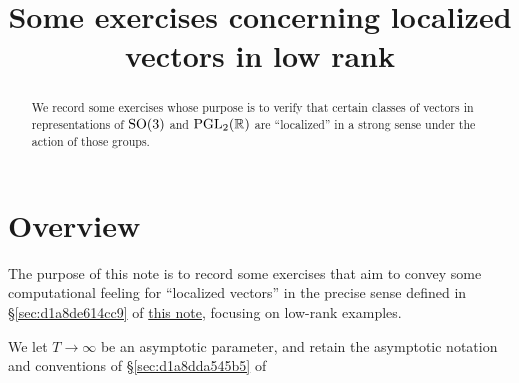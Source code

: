 \documentclass[reqno]{amsart} 
\title{Some exercises concerning localized vectors in low rank}
\numberwithin{equation}{section}
\numberwithin{theorem}{section}
\begin{document}
\maketitle
\tableofcontents


\begin{abstract}
We record some exercises whose purpose is to verify that certain classes of vectors in representations of $\operatorname{SO}(3)$ and $\operatorname{PGL}_2(\mathbb{R})$ are ``localized'' in a strong sense under the action of those groups.  
\end{abstract}

\section{Overview}\label{sec:d1a9162ede03}

The purpose of this note is to record some exercises that aim to convey some computational feeling for ``localized vectors'' in the precise sense defined in \S\ref{sec:d1a8de614cc9} of \href{20230522T150333__microlocal-localized-vectors.pdf}{this note}, focusing on low-rank examples.

We let $T \rightarrow \infty$ be an asymptotic parameter, and retain the asymptotic notation and conventions of \S\ref{sec:d1a8dda545b5} of




{} 
\end{document}
